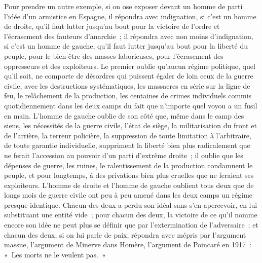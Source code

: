 \documentclass[french,twoside]{book} %
\begin{document}
Pour prendre un autre exemple, si on ose exposer devant un homme de parti l'idée d'un armistice en Espagne, il répondra avec indignation, si c'est un homme de droite, qu'il faut lutter jusqu'au bout pour la victoire de l'ordre et l'écrasement des fauteurs d'anarchie ; il répondra avec non moins d'indi­gnation, si c'est un homme de gauche, qu'il faut lutter jusqu'au bout pour la liberté du peuple, pour le bien-être des masses laborieuses, pour l'écrasement des oppresseurs et des exploiteurs. Le premier oublie qu'aucun régime politique, quel qu'il soit, ne comporte de désordres qui puissent égaler de loin ceux de la guerre civile, avec les destructions systématiques, les massacres en série sur la ligne de feu, le relâchement de la production, les centaines de crimes individuels commis quotidiennement dans les deux camps du fait que n'importe quel voyou a un fusil en main. L'homme de gauche oublie de son côté que, même dans le camp des siens, les nécessités de la guerre civile, l'état de siège, la militarisation du front et de l'arrière, la terreur policière, la suppression de toute limitation à l'arbitraire, de toute garantie individuelle, suppriment la liberté bien plus radicalement que ne ferait l'accession au pouvoir d'un parti d'extrême droite ; il oublie que les dépenses de guerre, les ruines, le ralentissement de la production condamnent le peuple, et pour longtemps, à des privations bien plus cruelles que ne feraient ses exploiteurs. L'homme de droite et l'homme de gauche oublient tous deux que de longs mois de guerre civile ont peu à peu amené dans les deux camps un régime presque identique. Chacun des deux a perdu son idéal sans s'en apercevoir, en lui substituant une entité vide ; pour chacun des deux, la victoire de ce qu'il nomme encore son idée ne peut plus se définir que par l'extermination de l'adversaire ; et chacun des deux, si on lui parle de paix, répondra avec mépris par l'argument massue, l'argument de Minerve dans Homère, l'argument de Poincaré en 1917 : « Les morts ne le veulent pas. »\par
\end{document}
